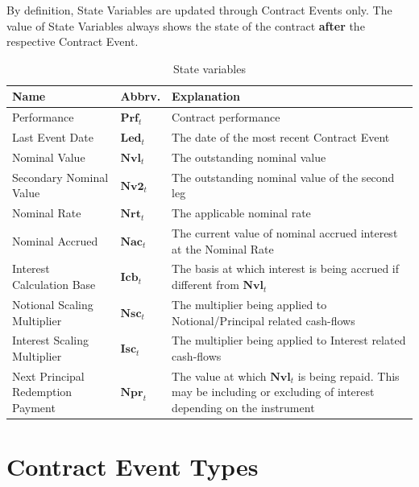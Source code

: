 \documentclass[9pt,oneside]{amsart}
\newcommand{\svar}[2]{\textbf{#1}_{#2}}
\begin{document}
\begin{multicols}{2}
By definition, State Variables are updated through Contract Events only. The value of State Variables always shows the state of the contract \textbf{after} the respective Contract Event.





\begin{table}[H]
	\centering
	\begin{tabular}{| p{0.8in}p{0.4in}p{1.6in} |}
	\hline
	\textbf{Name} & \textbf{Abbrv.} & \textbf{Explanation} \\
	\hline
	Performance & $\svar{Prf}{t}$ & Contract performance \\	
	\hline
	Last Event Date & $\svar{Led}{t}$ & The date of the most recent Contract Event \\
	\hline
	Nominal Value & $\svar{Nvl}{t}$ & The outstanding nominal value \\
	\hline
	Secondary Nominal Value & $\svar{Nv2}{t}$ & The outstanding nominal value of the second leg \\
	\hline
	Nominal Rate & $\svar{Nrt}{t}$ & The applicable nominal rate \\
	\hline
	Nominal Accrued & $\svar{Nac}{t}$ & The current value of nominal accrued interest at the Nominal Rate \\
	\hline
	Interest Calculation Base & $\svar{Icb}{t}$ & The basis at which interest is being accrued if different from $\svar{Nvl}{t}$ \\
	\hline
	Notional Scaling Multiplier & $\svar{Nsc}{t}$ & The multiplier being applied to Notional/Principal related
	cash-flows \\
	\hline
	Interest Scaling Multiplier & $\svar{Isc}{t}$ & The multiplier being applied to Interest related cash-flows \\
	\hline
	Next Principal Redemption Payment & $\svar{Npr}{t}$ & The value at which $\svar{Nvl}{t}$ is being repaid. This may be including or excluding of interest depending on the instrument\\
	\hline
	\end{tabular}
	\caption{State variables}
	\label{tbl:statevars}
\end{table}







\section{Contract Event Types}\label{sec:events}


\end{multicols}
\end{document}
